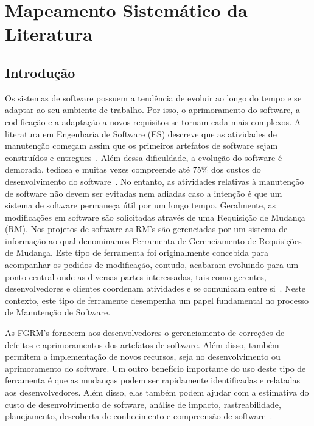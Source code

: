 
\chapter{Mapeamento Sistemático da Literatura}
\label{ch:mapeamento-sistematico}

\section{Introdução}
\label{sec:map-intro}

Os sistemas de software possuem a tendência de evoluir ao longo do tempo e se
adaptar ao seu ambiente de trabalho. Por isso, o aprimoramento do software,
a codificação e a adaptação a novos requisitos se tornam cada mais complexos. A
literatura em Engenharia de Software (ES) descreve que as atividades de
manutenção começam assim que os primeiros artefatos de software sejam
construídos e entregues~\cite{pigoski1996practical}. Além dessa dificuldade, a
evolução do software é demorada, tediosa e muitas vezes compreende até 75\% dos
custos do desenvolvimento do software~\cite{liu2012schedule}.  No entanto, as
atividades relativas à manutenção de software não devem ser evitadas nem adiadas
caso a intenção é que um sistema de software permaneça útil por um longo tempo.
Geralmente, as modificações em software são solicitadas através de uma Requisição
de Mudança (RM). Nos projetos de software as RM's são gerenciadas por um sistema
de informação ao qual denominamos Ferramenta de Gerenciamento de Requisições de
Mudança. Este tipo de ferramenta foi originalmente concebida para acompanhar
os pedidos de modificação, contudo, acabaram evoluindo para um ponto central
onde as diversas partes interessadas, tais como gerentes, desenvolvedores
e clientes coordenam atividades e se comunicam entre
si~\cite{bertram2010communication}. Neste contexto, este tipo de ferramente
desempenha um papel fundamental no processo de Manutenção de Software.

As FGRM's fornecem aos desenvolvedores o gerenciamento de correções de defeitos
e aprimoramentos dos artefatos de software. Além disso, também permitem a
implementação de novos recursos, seja no desenvolvimento ou aprimoramento do
software. Um outro benefício importante do uso deste tipo de ferramenta é que as
mudanças podem ser rapidamente identificadas e relatadas aos desenvolvedores.
Além disso, elas também podem ajudar com a estimativa do custo de
desenvolvimento de software, análise de impacto, rastreabilidade, planejamento,
descoberta de conhecimento e compreensão de software~\cite{cavalcanti2013bug}.

